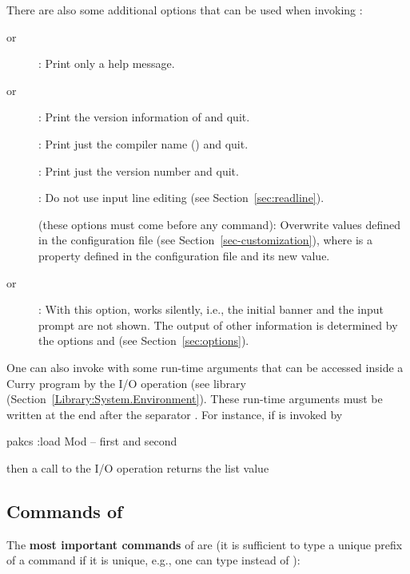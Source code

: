 There are also some additional options that can be used
when invoking \CYS:
\begin{description}
\item[ or ]:
Print only a help message.
\item[ or ]:
Print the version information of \CYS and quit.
\item[]:
Print just the compiler name () and quit.
\item[]:
Print just the version number and quit.
\item[]:
Do not use input line editing (see Section~\ref{sec:readline}).
\item[]
(these options must come before any \CYS command):
Overwrite values defined in the configuration file 
(see Section~\ref{sec-customization}),
where  is a property defined in the configuration file
and  its new value.
\item[ or ]:
With this option, \CYS works silently, i.e., the initial banner
and the input prompt are not shown.
The output of other information is determined by the options
 and  (see Section~\ref{sec:options}).
\end{description}
%
One can also invoke \CYS with some run-time arguments
that can be accessed inside a Curry program
by the I/O operation 
(see library  (Section~\ref{Library:System.Environment}).
These run-time arguments must be written at the end after
the separator \ccode{--}.
For instance, if \CYS is invoked by
\begin{curry}
pakcs :load Mod -- first and second
\end{curry}
then a call to the I/O operation 
returns the list value
\begin{curry}
\end{curry}


\subsection{Commands of \CYS}
\label{sec:pakcs-commands}

The {\bf most important commands} of \CYS are
(it is sufficient to type a unique prefix of a command if it is unique,
e.g., one can type  instead of ):

